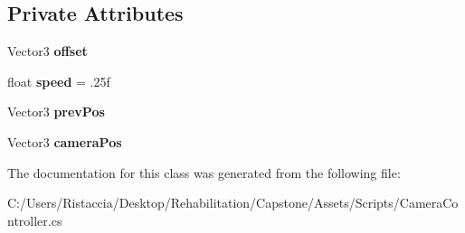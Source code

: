 \subsection*{Private Attributes}
\begin{DoxyCompactItemize}
\item 
\mbox{\label{class_camera_controller_aff80d2275dae360196361c39078bfda4}} 
Vector3 {\bfseries offset}
\item 
\mbox{\label{class_camera_controller_a93ef421c03963ab5728806d23a25a00e}} 
float {\bfseries speed} = .\+25f
\item 
\mbox{\label{class_camera_controller_af4374f433fa693f621f361cebc1dee38}} 
Vector3 {\bfseries prev\+Pos}
\item 
\mbox{\label{class_camera_controller_ac1dae104bf824886601a1a47857efec1}} 
Vector3 {\bfseries camera\+Pos}
\end{DoxyCompactItemize}


The documentation for this class was generated from the following file\+:\begin{DoxyCompactItemize}
\item 
C\+:/\+Users/\+Ristaccia/\+Desktop/\+Rehabilitation/\+Capstone/\+Assets/\+Scripts/Camera\+Controller.\+cs\end{DoxyCompactItemize}
